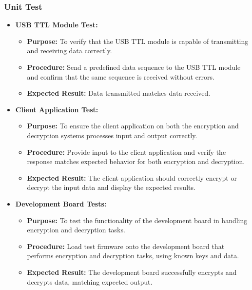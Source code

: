 \documentclass[12pt]{article}
\begin{document}
\subsubsection*{Unit Test}
\begin{itemize}
	\item \textbf{USB TTL Module Test:}
	\begin{itemize}
		\item \textbf{Purpose:} To verify that the USB TTL module is capable of transmitting and receiving data correctly.
		\item \textbf{Procedure:} Send a predefined data sequence to the USB TTL module and confirm that the same sequence is received without errors.
		\item \textbf{Expected Result:} Data transmitted matches data received.
	\end{itemize}
	
	\item \textbf{Client Application Test:}
	\begin{itemize}
		\item \textbf{Purpose:} To ensure the client application on both the encryption and decryption systems processes input and output correctly.
		\item \textbf{Procedure:} Provide input to the client application and verify the response matches expected behavior for both encryption and decryption.
		\item \textbf{Expected Result:} The client application should correctly encrypt or decrypt the input data and display the expected results.
	\end{itemize}
	
	\item \textbf{Development Board Tests:}
	\begin{itemize}
		\item \textbf{Purpose:} To test the functionality of the development board in handling encryption and decryption tasks.
		\item \textbf{Procedure:} Load test firmware onto the development board that performs encryption and decryption tasks, using known keys and data.
		\item \textbf{Expected Result:} The development board successfully encrypts and decrypts data, matching expected output.
	\end{itemize}
\end{itemize}
\end{document}
